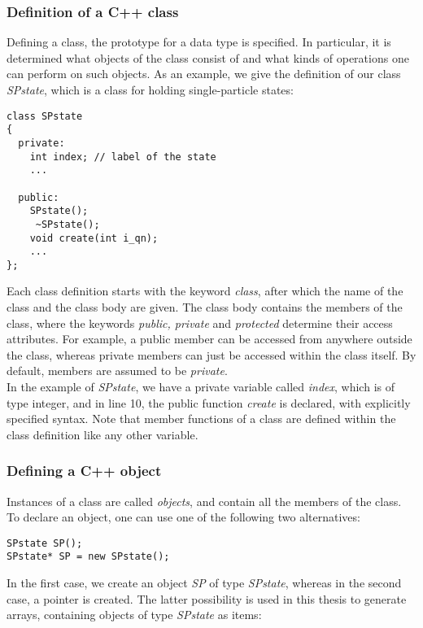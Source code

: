 \subsubsection{Definition of a C++ class}
Defining a class, the prototype for a data type is specified. In particular, it is determined what objects of the class  consist of and what kinds of operations one can perform on such objects.
As an example, we give the definition of our class \textit{SPstate}, which is a class for holding single-particle states:

\begin{lstlisting}[backgroundcolor=\color{lighter-gray}]
class SPstate
{   
  private:
    int index; // label of the state
    ...
    
  public:
    SPstate();
     ~SPstate();    
    void create(int i_qn);
    ...
};
\end{lstlisting}

Each class definition starts with the keyword \textit{class}, after which the name of the class and the class body are given. The class body contains the members of the class, where the keywords \textit{public, private} and \textit{protected} determine their access attributes. For example, a public member can be accessed from anywhere outside the class, whereas private members can just be accessed within the class itself. By default, members are assumed to be \textit{private}. %
\\ In the example of \textit{SPstate}, we have a private variable called \textit{index}, which is of type integer, and in line 10, the public function \textit{create} is declared, with explicitly specified syntax. Note that member functions of a class are defined within the class definition like any other variable.

\subsubsection{Defining a C++ object}
Instances of a class are called \textit{objects}, and contain all the members of the class. To declare an object, one can use one of the following two alternatives:

\begin{lstlisting}[backgroundcolor=\color{lighter-gray}, numbers=none]
SPstate SP();
SPstate* SP = new SPstate();
\end{lstlisting}

In the first case, we create an object \textit{SP} of type \textit{SPstate}, whereas in the second case, a pointer is created. The latter possibility is used in this thesis to generate arrays, containing objects of type \textit{SPstate}  as items:

